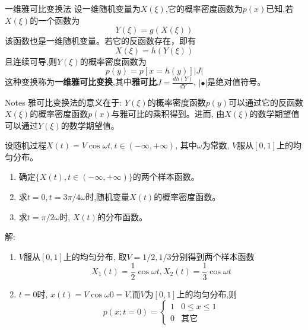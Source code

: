 \begin{frame}{一维雅可比变换法}
设一维随机变量为$X(\xi)$,它的概率密度函数为$p(x)$已知,若$X(\xi)$的一个函数为
\[Y(\xi)=g(X(\xi)) \]
该函数也是一维随机变量。若它的反函数存在，即有
\[X(\xi)=h(Y(\xi)) \]
且连续可导,则$Y(\xi)$的概率密度函数为
\[p(y)=p[x=h(y)]|J| \]
这种变换称为\textbf{一维雅可比变换},其中\textbf{雅可比}$J=\frac{dh(Y)}{dY}$, $|\bullet|$是绝对值符号。
\begin{block}{Notes}
	雅可比变换法的意义在于: $Y(\xi)$的概率密度函数$p(y)$可以通过它的反函数$X(\xi)$的概率密度函数$p(x)$与雅可比的乘积得到。进而, 由$X(\xi)$的数学期望值可以通过$Y(\xi)$的数学期望值。
\end{block}
\end{frame}

\begin{frame}
\begin{example}
	设随机过程$X(t)=V\cos\omega t,t\in(-\infty,+\infty)$, 其中$\omega$为常数, $V$服从$[0,1]$上的均匀分布。
	\begin{enumerate}
		\item 确定$\{X(t),t\in(-\infty,+\infty)\}$的两个样本函数。
		\item 求$t=0,t=3\pi/4\omega$时,随机变量$X(t)$的概率密度函数。
		\item 求$t=\pi/2\omega$时, $X(t)$的分布函数。
	\end{enumerate}
\end{example}
\end{frame}

\begin{frame}
解:
\begin{enumerate}
	\item $V$服从$[0,1]$上的均匀分布, 取$V=1/2,1/3$分别得到两个样本函数
	\[X_1(t)=\frac{1}{2}\cos\omega t,X_2(t)=\frac{1}{3}\cos\omega t\]
	\item $t=0$时, $x(t)=V\cos\omega 0=V$,而$V$为$[0,1]$上的均匀分布,则
	$$
	p(x;t=0)=\begin{cases}
	1 & 0\le x\le 1\\
	0 &\text{其它}
	
\end{cases}
$$
\end{enumerate}
\end{frame}

